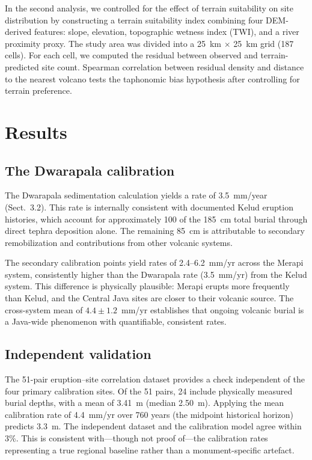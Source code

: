 \documentclass[12pt,a4paper]{article}
\begin{document}
In the second analysis, we controlled for the effect of terrain suitability on site distribution by constructing a terrain suitability index combining four DEM-derived features: slope, elevation, topographic wetness index (TWI), and a river proximity proxy. The study area was divided into a 25~km $\times$ 25~km grid (187 cells). For each cell, we computed the residual between observed and terrain-predicted site count. Spearman correlation between residual density and distance to the nearest volcano tests the taphonomic bias hypothesis after controlling for terrain preference.


\section{Results}

\subsection{The Dwarapala calibration}

The Dwarapala sedimentation calculation yields a rate of 3.5~mm/year (Sect.~3.2). This rate is internally consistent with documented Kelud eruption histories, which account for approximately 100 of the 185~cm total burial through direct tephra deposition alone. The remaining 85~cm is attributable to secondary remobilization and contributions from other volcanic systems.

The secondary calibration points yield rates of 2.4--6.2~mm/yr across the Merapi system, consistently higher than the Dwarapala rate (3.5~mm/yr) from the Kelud system. This difference is physically plausible: Merapi erupts more frequently than Kelud, and the Central Java sites are closer to their volcanic source. The cross-system mean of $4.4 \pm 1.2$~mm/yr establishes that ongoing volcanic burial is a Java-wide phenomenon with quantifiable, consistent rates.

\subsection{Independent validation}

The 51-pair eruption--site correlation dataset provides a check independent of the four primary calibration sites. Of the 51 pairs, 24 include physically measured burial depths, with a mean of 3.41~m (median 2.50~m). Applying the mean calibration rate of 4.4~mm/yr over 760 years (the midpoint historical horizon) predicts 3.3~m. The independent dataset and the calibration model agree within 3\%. This is consistent with---though not proof of---the calibration rates representing a true regional baseline rather than a monument-specific artefact.
\end{document}
